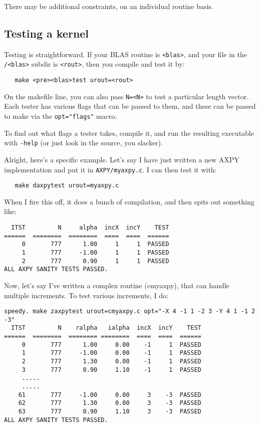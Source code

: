 \documentclass[11pt]{article}
\begin{document}
There may be additional constraints, on an individual routine basis.

\subsection{Testing a kernel}
Testing is straightforward.  If your BLAS routine is {\tt <blas>},
and your file in the {\tt /<blas>} subdir is {\tt <rout>},
then you compile and test it by:
\begin{verbatim}
   make <pre><blas>test urout=<rout>
\end{verbatim}

On the makefile line, you can also pass {\tt N=<N>} to test a particular
length vector.  Each tester has various flags that can be passed to them,
and these can be passed to make via the {\tt opt="flags"} macro.

To find out what flags a tester takes, compile it, and run the resulting
executable with {\tt -help} (or just look in the source, you slacker).

Alright, here's a specific example.  Let's say I have just written a new
AXPY implementation and put it in {\tt AXPY/myaxpy.c}.  I can then test
it with:
\begin{verbatim}
   make daxpytest urout=myaxpy.c
\end{verbatim}

When I fire this off, it does a bunch of compilation, and then spits out
something like:
\begin{verbatim}
  ITST         N     alpha  incX  incY    TEST
======  ========  ========  ====  ====  ======
     0       777      1.00     1     1  PASSED
     1       777     -1.00     1     1  PASSED
     2       777      0.90     1     1  PASSED
ALL AXPY SANITY TESTS PASSED.
\end{verbatim}

Now, let's say I've written a complex routine (cmyaxpy), that can handle
multiple increments.  To test various increments, I do:
\begin{verbatim}
speedy. make zaxpytest urout=cmyaxpy.c opt="-X 4 -1 1 -2 3 -Y 4 1 -1 2 -3"
  ITST         N    ralpha   ialpha  incX  incY    TEST
======  ========  ======== ========  ====  ====  ======
     0       777      1.00     0.00    -1     1  PASSED
     1       777     -1.00     0.00    -1     1  PASSED
     2       777      1.30     0.00    -1     1  PASSED
     3       777      0.90     1.10    -1     1  PASSED
     .....
     .....
    61       777     -1.00     0.00     3    -3  PASSED
    62       777      1.30     0.00     3    -3  PASSED
    63       777      0.90     1.10     3    -3  PASSED
ALL AXPY SANITY TESTS PASSED.
\end{verbatim}
\end{document}
